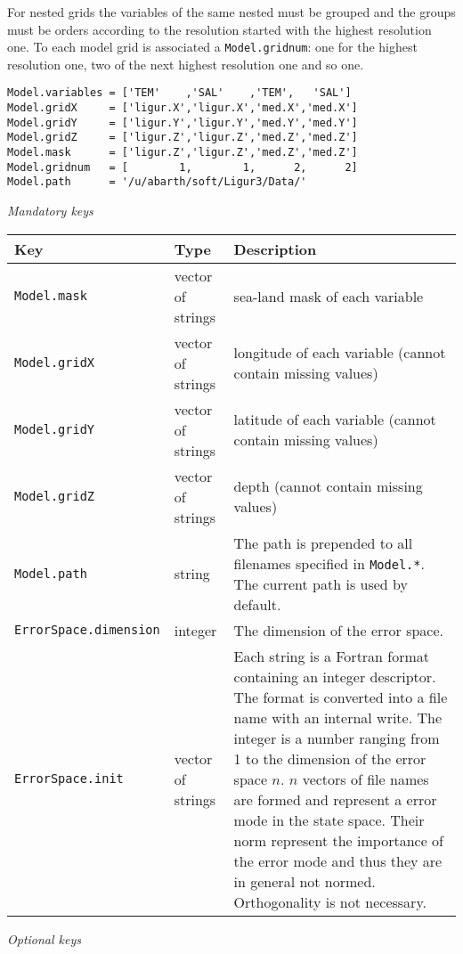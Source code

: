 \documentclass[a4paper,12pt]{article}
\newcommand{\code}{\texttt}
\newenvironment{keytabular}{\begin{tabular}{|p{0.3\textwidth}|p{0.2\textwidth}|p{0.5\textwidth}|} \hline Key & Type & Description \\ \hline \hline }{\end{tabular}}
\newcommand{\subsubsubsection}[1]{\bigskip \textit{#1} \medskip}
\begin{document}
{%
For nested grids the variables of the same nested must be grouped
and the groups must be orders according to the resolution started with
the highest resolution one. To each model grid is associated a
\code{Model.gridnum}: one for the highest resolution one, two of the
next highest resolution one and so one.

\begin{verbatim} 
Model.variables = ['TEM'    ,'SAL'    ,'TEM',   'SAL'] 
Model.gridX     = ['ligur.X','ligur.X','med.X','med.X'] 
Model.gridY     = ['ligur.Y','ligur.Y','med.Y','med.Y'] 
Model.gridZ     = ['ligur.Z','ligur.Z','med.Z','med.Z'] 
Model.mask      = ['ligur.Z','ligur.Z','med.Z','med.Z'] 
Model.gridnum   = [        1,        1,      2,      2] 
Model.path      = '/u/abarth/soft/Ligur3/Data/' 
\end{verbatim}}

\subsubsubsection{Mandatory keys}

\begin{keytabular}
\code{Model.mask} & vector of strings &  sea-land mask of each variable 
\\
\code{Model.gridX} & vector of strings & longitude of each variable (cannot contain missing values)
\\
\code{Model.gridY} & vector of strings & latitude of each variable  (cannot contain missing values)
\\
\code{Model.gridZ} & vector of strings & depth  (cannot contain missing values)
\\
\code{Model.path} & string & The path is prepended to all filenames
specified in \code{Model.*}. The current path is used by default.
\\
\code{ErrorSpace.dimension} & integer & The dimension of the error space.
\\
\code{ErrorSpace.init} & vector of strings &
Each string is a Fortran format containing an integer descriptor. The format is converted into a
file name with an internal write. The integer is a number ranging from 1
to the dimension of the error space $n$. $n$ vectors of file names are
formed and represent a error mode in the state space. Their norm
represent the importance of the error mode and thus they are in
general not normed. Orthogonality is not necessary.
\\
\hline
\end{keytabular}

\subsubsubsection{Optional keys}
\end{document}
